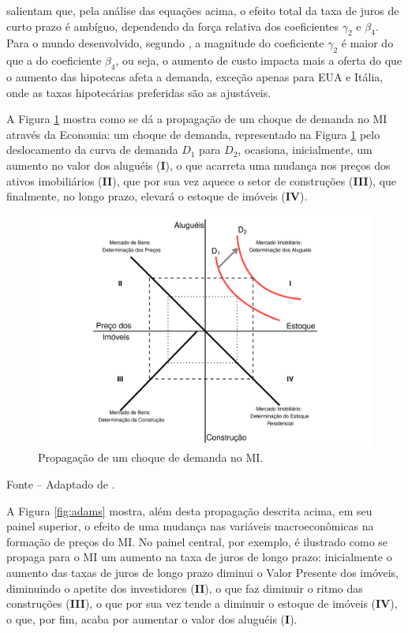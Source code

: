 \documentclass[
	12pt,				%
	oneside,			%
	a4paper,			%
	chapter=TITLE,		%
	section=TITLE,		%
	english,			%
	brazil				%
	]{abntex2}
\newcommand{\bcenter}{\begin{center}}
\newcommand{\ecenter}{\end{center}}
\begin{document}
\begin{refsection}
\textcite{ADAMS2010} salientam que, pela análise das equações acima, o efeito total da taxa
de juros de curto prazo é ambíguo, dependendo da força relativa dos coeficientes
\(\gamma_2\) e \(\beta_4\). Para o mundo desenvolvido, segundo \textcite[p.~15]{ADAMS2010},
a magnitude do coeficiente \(\gamma_2\) é maior do que a do coeficiente \(\beta_4\),
ou seja, o aumento de custo impacta mais a oferta do que o aumento das hipotecas
afeta a demanda, exceção apenas para \gls{EUA} e Itália, onde as taxas hipotecárias
preferidas são as ajustáveis.

A Figura \ref{fig:macroInfluence} mostra como se dá a propagação de um choque
de demanda no \gls{MI} através da Economia: um choque de demanda, representado
na Figura \ref{fig:macroInfluence} pelo deslocamento da curva de demanda \(D_1\)
para \(D_2\), ocasiona, inicialmente, um aumento no valor dos aluguéis (\textbf{I}), o
que acarreta uma mudança nos preços dos ativos imobiliários (\textbf{II}), que por
sua vez aquece o setor de construções (\textbf{III}), que finalmente, no longo prazo,
elevará o estoque de imóveis (\textbf{IV}).
\begin{figure}[H]

{\centering \includegraphics[width=0.7\linewidth]{images/macroInfluence-1} 

}

\caption{Propagação de um choque de demanda no \gls{MI}.}\label{fig:macroInfluence}
\end{figure}
\bcenter

\small Fonte -- Adaptado de \textcite{ADAMS2010}.
\ecenter

A Figura \ref{fig:adams} mostra, além desta propagação descrita acima, em seu
painel superior, o efeito de uma mudança nas variáveis macroeconômicas na
formação de preços do \gls{MI}. No painel central, por exemplo, é ilustrado como
se propaga para o \gls{MI} um aumento na taxa de juros de longo prazo:
inicialmente o aumento das taxas de juros de longo prazo diminui o Valor
Presente dos imóveis, diminuindo o apetite dos investidores (\textbf{II}), o que faz
diminuir o ritmo das construções (\textbf{III}), o que por sua vez tende a diminuir o
estoque de imóveis (\textbf{IV}), o que, por fim, acaba por aumentar o valor dos
aluguéis (\textbf{I}).


\end{refsection}
\end{document}
